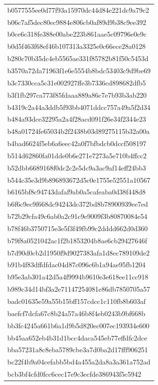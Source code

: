 \begin{tabular}{l}
b0577555ee0d77f93a15970dc44d84e221dc9a79c2 \\
b06c7af5dec80ec9884e806cb0af89d9b38c9ee392 \\
b0ce6c318fe388e00abe223b861aae5c09796e0e9c \\
b0d5f463f68ef46b107313a3325e0c66ece28a0128 \\
b280c70b35dc4eb5565ae331f85782b81f50c5453d \\
b3570a72da71963f1e6e5554b8bdc53403c9d9be69 \\
b3c7330cca5c31e002927ffe3b7336cd898682dfb5 \\
b3f1fb297ca773f85fdaaa889a86c7e7b93b3ab220 \\
b4319c2a44a3ddb5f93bb4071ddcc757a49a5f2d34 \\
b484a93dce32295a2a4f28acd091f26e34f2344e23 \\
b48a01724fe65034b2f2438b03d89275115b32a00a \\
b4bad6624f5eb6a6eec42a0f7bfbdcb0dccf508197 \\
b514d62860fa01dde0b6e271e7273a5e710b4ffcc2 \\
b52dbb6689168f0dc2c2e5dc9a3ac9af14eff24bb3 \\
b544c35e3d9b896893672d5c0e1755e52551a10567 \\
b6165bf8c94743dafaf9ab0a5cafeaba0d38f448d8 \\
b6f6c9ec9f668dc94243dc372bd8b78900939ee7ed \\
b72b29cfa49c6ab0a2c91c9e9009f3b80870084e54 \\
b78f46b3750715e3e5f3f49fb99c2dddd662d0d360 \\
b79f8a0521042ac1f2b1853204b8ae6cb29427646f \\
b7d90d0cb2d1950f9d9027383afa1d8ec789109de2 \\
b91b4f83dffdfdac04d87c096c6b1a94ae95fb1204 \\
b95e3ab301a42d5a4f9994b9610e3e618ee11cc918 \\
b989c34d14bf3a2e71147254081e86db7850705a57 \\
badc01635e59a55b15bff157cdcc1c110fb8b603af \\
baefcf7dcfa67c8b24a57a46b8f4eb0243b9bf668b \\
bb3fc4245a661b6a1d9b5d820ec007ec193934e600 \\
bb45aa652eb4b31d1bcc4daca545eb77effdfc2dce \\
bba57231a8c8eba5789cbe3a7d0ba2d17fff906251 \\
bc22f4b9a04cefabb5bd4a455a2da8a3a361a752ad \\
bcb3bf4cfd0fcc6cec17e9c3ecfde386943f5c5942 \\

\end{tabular}
